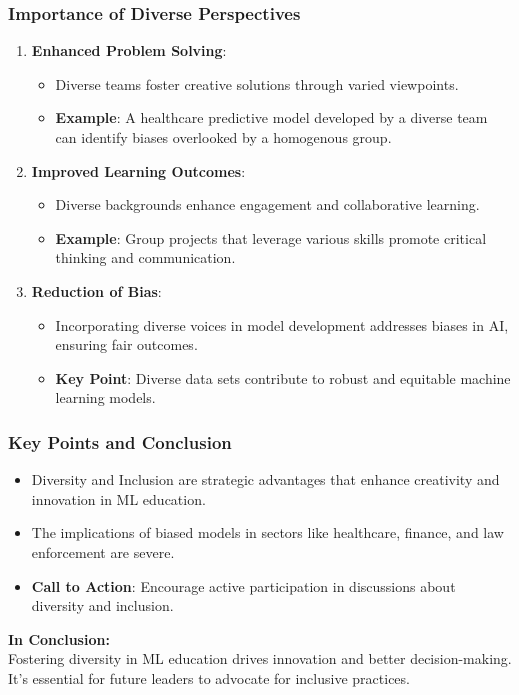 \documentclass[aspectratio=169]{beamer}
\begin{document}
\begin{frame}[fragile]
    \frametitle{Importance of Diverse Perspectives}
    \begin{enumerate}
        \item \textbf{Enhanced Problem Solving}:
        \begin{itemize}
            \item Diverse teams foster creative solutions through varied viewpoints.
            \item \textbf{Example}: A healthcare predictive model developed by a diverse team can identify biases overlooked by a homogenous group.
        \end{itemize}
        \pause
        \item \textbf{Improved Learning Outcomes}:
        \begin{itemize}
            \item Diverse backgrounds enhance engagement and collaborative learning.
            \item \textbf{Example}: Group projects that leverage various skills promote critical thinking and communication.
        \end{itemize}
        \pause
        \item \textbf{Reduction of Bias}:
        \begin{itemize}
            \item Incorporating diverse voices in model development addresses biases in AI, ensuring fair outcomes.
            \item \textbf{Key Point}: Diverse data sets contribute to robust and equitable machine learning models.
        \end{itemize}
    \end{enumerate}
\end{frame}

\begin{frame}[fragile]
    \frametitle{Key Points and Conclusion}
    \begin{itemize}
        \item Diversity and Inclusion are strategic advantages that enhance creativity and innovation in ML education.
        \item The implications of biased models in sectors like healthcare, finance, and law enforcement are severe.
        \item \textbf{Call to Action}: Encourage active participation in discussions about diversity and inclusion.
    \end{itemize}
    \pause
    \textbf{In Conclusion:} \\
    Fostering diversity in ML education drives innovation and better decision-making. It's essential for future leaders to advocate for inclusive practices.
\end{frame}
\end{document}
